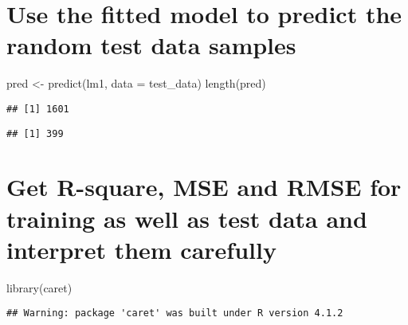 \documentclass[
]{article}
\newenvironment{Shaded}{\begin{snugshade}}{\end{snugshade}}
\newcommand{\AttributeTok}[1]{\textcolor[rgb]{0.77,0.63,0.00}{#1}}
\newcommand{\FunctionTok}[1]{\textcolor[rgb]{0.00,0.00,0.00}{#1}}
\newcommand{\NormalTok}[1]{#1}
\newcommand{\OtherTok}[1]{\textcolor[rgb]{0.56,0.35,0.01}{#1}}
\newcommand{\SpecialCharTok}[1]{\textcolor[rgb]{0.00,0.00,0.00}{#1}}
\newcommand{\StringTok}[1]{\textcolor[rgb]{0.31,0.60,0.02}{#1}}
\begin{document}
\hypertarget{use-the-fitted-model-to-predict-the-random-test-data-samples}{%
\section{Use the fitted model to predict the random test data
samples}\label{use-the-fitted-model-to-predict-the-random-test-data-samples}}

\begin{Shaded}
\begin{Highlighting}[]
\NormalTok{pred }\OtherTok{\textless{}{-}} \FunctionTok{predict}\NormalTok{(lm1, }\AttributeTok{data =}\NormalTok{ test\_data)}
\FunctionTok{length}\NormalTok{(pred)}
\end{Highlighting}
\end{Shaded}

\begin{verbatim}
## [1] 1601
\end{verbatim}

\begin{Shaded}
\end{Shaded}

\begin{verbatim}
## [1] 399
\end{verbatim}

\hypertarget{get-r-square-mse-and-rmse-for-training-as-well-as-test-data-and-interpret-them-carefully}{%
\section{Get R-square, MSE and RMSE for training as well as test data
and interpret them
carefully}\label{get-r-square-mse-and-rmse-for-training-as-well-as-test-data-and-interpret-them-carefully}}

\begin{Shaded}
\begin{Highlighting}[]
\FunctionTok{library}\NormalTok{(}\StringTok{\textquotesingle{}caret\textquotesingle{}}\NormalTok{)}
\end{Highlighting}
\end{Shaded}

\begin{verbatim}
## Warning: package 'caret' was built under R version 4.1.2
\end{verbatim}
\end{document}

